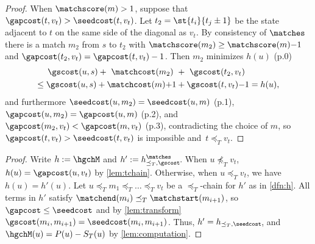 \begin{proof}
  When $\matchscore(m) > 1$, suppose that $\gapcost(t, v_t) > \seedcost(t, v_t)$. Let
  ${t_2=\st{t_i}{t_j\pm 1}}$ be the state adjacent to $t$ on the same side of the
  diagonal as $v_t$.
  By consistency of $\matches$ there is a match $m_2$ from $s$ to $t_2$ with
  $\matchscore(m_2) \geq \matchscore(m){-}1$ and $\gapcost(t_2, v_t) = \gapcost(t,
  v_t) -1$.
  Then $m_2$ minimizes $h(u)$ (p.0)
  \begin{align*}
    \gscost(u, s) + \ \matchcost(m_2)\  &+ \ \gscost(t_2, v_t)\\
  \leq \gscost(u, s) + \matchcost(m){+}1 &+ \gscost(t, v_t){-}1 = h(u),
  \end{align*}
  and furthermore $\seedcost(u, m_2) = \seedcost(u, m)$ (p.1), $\gapcost(u, m_2) = \gapcost(u, m)$ (p.2), and
  $\gapcost(m_2, v_t) < \gapcost(m, v_t)$ (p.3), contradicting the choice of $m$,
  so $\gapcost(t, v_t) > \seedcost(t, v_t)$ is impossible and~${t\preceq_T v_t}$.
\end{proof}

\thmgapcost*
\begin{proof}
  Write $h:=\hgchM$ and $h':= h^\matches_{\preceq_T,\gscost}\!$. When
  ${u\npreceq_T v_t}$, ${h(u) = \gapcost(u,v_t)}$ by
  \cref{lem:tchain}. Otherwise, when ${u{\preceq_T} v_t}$, we have ${h(u) =
  h'(u)}$. Let $u{\preceq_T} m_1 {\preceq_T} \dots {\preceq_T} v_t$ be a
  $\preceq_T$-chain for $h'$ as in \cref{dfn:h}. All terms in $h'$
  satisfy $\matchend(m_i) \preceq_T \matchstart(m_{i+1})$, so ${\gapcost \leq
  \seedcost}$ and by \cref{lem:transform} $\gscost(m_i, m_{i+1}) = \seedcost(m_i, m_{i+1})$. Thus,
  ${h' = h_{\preceq_T, \seedcost}}\!$, and $\hgchM(u) = P(u) - S_T(u)$ by \cref{lem:computation}.
\end{proof}

